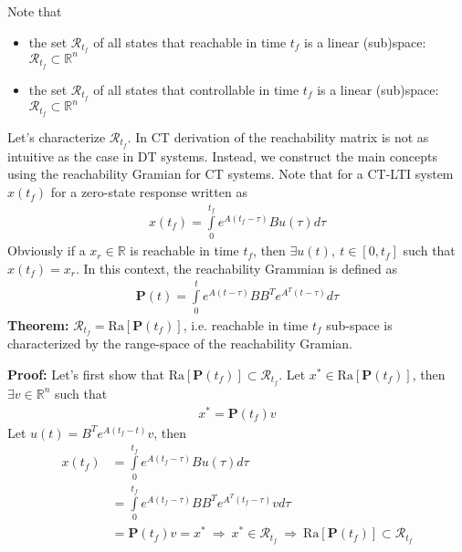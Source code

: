 \documentclass[twoside]{article}
\begin{document}
Note that
\begin{itemize}
  \item the set $\mathcal{R}_{t_f}$ of all states that reachable in time $t_f$ is a linear
(sub)space: $\mathcal{R}_{t_f} \subset \mathbb{R}^n$
  \item the set $\mathcal{R}_{t_f}$ of all states that controllable in time $t_f$ is a linear
(sub)space: $\mathcal{R}_{t_f} \subset \mathbb{R}^n$
\end{itemize}

Let's characterize $\mathcal{R}_{t_f}$. In CT derivation of the reachability 
matrix is not as intuitive as the case in DT systems. Instead, we construct the
main concepts using the reachability Gramian for CT systems. Note that 
for a CT-LTI system $x(t_f)$ for a zero-state response written as
%
\begin{align*}
  x(t_f) = \int\limits_{0}^{t_f} e^{A (t_f - \tau)} B u(\tau) d \tau
\end{align*}
%
Obviously if a $x_r \in \mathbb{R}$ is reachable in time $t_f$, 
then $\exists u(t), \ t \in [0 , t_f]$ such that $x(t_f) = x_r$. In this context,
the reachability Grammian is defined as
%
\begin{align}
    \textbf{P}(t) = \int\limits_{0}^{t} e^{A (t - \tau)} B B^T e^{A^T (t - \tau)}  d \tau 
\end{align}
%
\textbf{Theorem:} $\mathcal{R}_{t_f} = \mathrm{Ra}[ \textbf{P}(t_f) ]$, i.e. reachable in time $t_f$ sub-space is characterized by the range-space of the reachability Gramian.

\textbf{Proof:} Let's first show that $\mathrm{Ra}[ \textbf{P}(t_f) ] \subset \mathcal{R}_{t_f}$.
Let $x^* \in \mathrm{Ra}[ \textbf{P}(t_f) ]$, then $\exists v \in \mathbb{R}^n$ such that 
%
\begin{align}
    x^* = \textbf{P}(t_f) v
\end{align}
%
Let $u(t) = B^T e^{A (t_f - t)} v$, then
%
\begin{align*}
  x(t_f) &= \int\limits_{0}^{t_f} e^{A (t_f - \tau)} B u(\tau) d \tau
  \\
  &= \int\limits_{0}^{t_f} e^{A (t_f - \tau)} B B^T e^{A^T (t_f - \tau)} v d \tau
  \\
  &= \textbf{P}(t_f) v = x^* \ \Rightarrow \ x^* \in  \mathcal{R}_{t_f} 
  \ \Rightarrow \ \mathrm{Ra}[ \textbf{P}(t_f) ] \subset \mathcal{R}_{t_f}
\end{align*}
\end{document}
